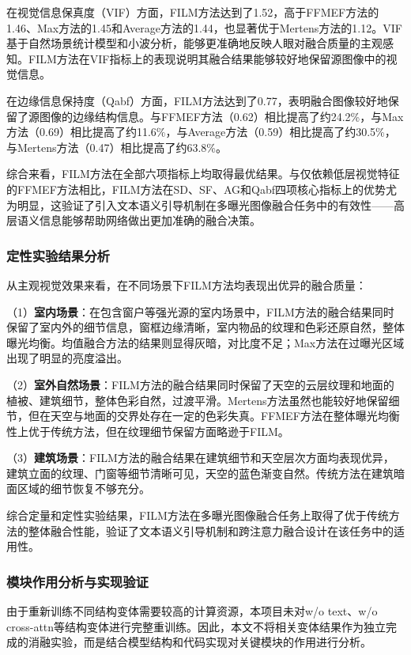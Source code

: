 在视觉信息保真度（VIF）方面，FILM方法达到了1.52，高于FFMEF方法的1.46、Max方法的1.45和Average方法的1.44，也显著优于Mertens方法的1.12。VIF基于自然场景统计模型和小波分析，能够更准确地反映人眼对融合质量的主观感知。FILM方法在VIF指标上的表现说明其融合结果能够较好地保留源图像中的视觉信息。

在边缘信息保持度（Qabf）方面，FILM方法达到了0.77，表明融合图像较好地保留了源图像的边缘结构信息。与FFMEF方法（0.62）相比提高了约24.2\%，与Max方法（0.69）相比提高了约11.6\%，与Average方法（0.59）相比提高了约30.5\%，与Mertens方法（0.47）相比提高了约63.8\%。

综合来看，FILM方法在全部六项指标上均取得最优结果。与仅依赖低层视觉特征的FFMEF方法相比，FILM方法在SD、SF、AG和Qabf四项核心指标上的优势尤为明显，这验证了引入文本语义引导机制在多曝光图像融合任务中的有效性——高层语义信息能够帮助网络做出更加准确的融合决策。

\subsubsection{定性实验结果分析}\label{sec:qualitative_results}

从主观视觉效果来看，在不同场景下FILM方法均表现出优异的融合质量：

（1）\textbf{室内场景}：在包含窗户等强光源的室内场景中，FILM方法的融合结果同时保留了室内外的细节信息，窗框边缘清晰，室内物品的纹理和色彩还原自然，整体曝光均衡。均值融合方法的结果则显得灰暗，对比度不足；Max方法在过曝光区域出现了明显的亮度溢出。

（2）\textbf{室外自然场景}：FILM方法的融合结果同时保留了天空的云层纹理和地面的植被、建筑细节，整体色彩自然，过渡平滑。Mertens方法虽然也能较好地保留细节，但在天空与地面的交界处存在一定的色彩失真。FFMEF方法在整体曝光均衡性上优于传统方法，但在纹理细节保留方面略逊于FILM。

（3）\textbf{建筑场景}：FILM方法的融合结果在建筑细节和天空层次方面均表现优异，建筑立面的纹理、门窗等细节清晰可见，天空的蓝色渐变自然。传统方法在建筑暗面区域的细节恢复不够充分。

综合定量和定性实验结果，FILM方法在多曝光图像融合任务上取得了优于传统方法的整体融合性能，验证了文本语义引导机制和跨注意力融合设计在该任务中的适用性。

\subsubsection{模块作用分析与实现验证}\label{sec:ablation}

由于重新训练不同结构变体需要较高的计算资源，本项目未对w/o text、w/o cross-attn等结构变体进行完整重训练。因此，本文不将相关变体结果作为独立完成的消融实验，而是结合模型结构和代码实现对关键模块的作用进行分析。

